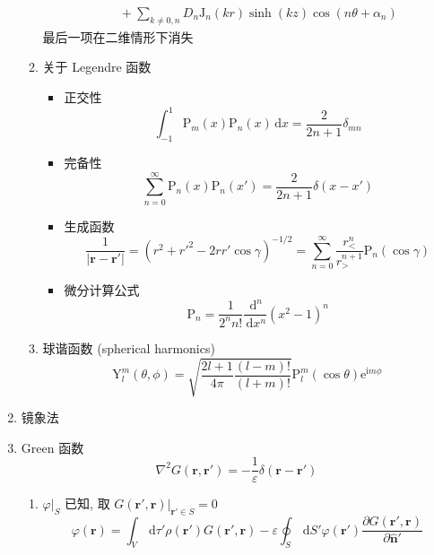 \documentclass[12pt,a4paper]{article}%
\numberwithin{equation}{section}%
\renewcommand*{\vec}[1]{\bm{#1}}%
\newcommand{\dif}{\,\mathrm d}
\newcommand\mi{\mathrm{i}}
\newcommand\e{\mathrm{e}}%
\newcommand*{\uvec}[1]{\hat{\vec{#1}}}
\begin{document}
\begin{enumerate}
\begin{enumerate}
\begin{align}
            & \quad + \sum_{k\neq 0,n}D_n\mathrm J_n(kr)\sinh(kz)\cos(n\theta + \alpha_n)
        \end{align}
        最后一项在二维情形下消失
        \item 关于 Legendre 函数
        \begin{itemize}
            \item 正交性
            \begin{equation}
                \int_{-1}^1\mathrm P_m(x)\mathrm P_n(x)\dif x = \frac2{2n+1}\delta_{mn}
            \end{equation}
            \item 完备性
            \begin{equation}
                \sum_{n=0}^\infty \mathrm P_n(x) \mathrm P_n(x') = \frac{2}{2n+1}\delta(x-x')
            \end{equation}
            \item 生成函数
            \begin{equation}
                \frac 1{|\vec r - \vec r'|} = (r^2 + r'^2 - 2rr'\cos\gamma)^{-1/2} = \sum_{n=0}^\infty\frac{r^n_<}{r^{n+1}_>}\mathrm P_n(\cos\gamma)
            \end{equation}
            \item 微分计算公式
            \begin{equation}
                \mathrm P_n = \frac1{2^n n!}\frac{\dif^n}{\dif x^n}(x^2 - 1)^n
            \end{equation}
        \end{itemize}
        \item 球谐函数 (spherical harmonics)
        \begin{equation}
            \mathrm Y_{l}^m(\theta,\phi) = \sqrt{\frac{2l+1}{4\pi}\frac{(l-m)!}{(l+m)!}}\mathrm P_l^m(\cos\theta)\e^{\mi m\phi}
        \end{equation}
    \end{enumerate}
    \item 镜象法
    \item Green 函数
    \begin{equation}
        \nabla^2 G(\vec r, \vec r') = -\frac 1\varepsilon\delta(\vec r - \vec r')
    \end{equation}
    \begin{enumerate}
        \item $\varphi|_{S}$ 已知, 取 $G(\vec r',\vec r)|_{\vec r'\in S} = 0$
        \begin{equation}
            \varphi (\vec r) = \int_V\dif \tau'\rho(\vec r')G(\vec r',\vec r) - \varepsilon\oint_S\dif S'\varphi(\vec r')\frac{\partial G(\vec r',\vec r)}{\partial \uvec n'}

\end{equation}
\end{enumerate}
\end{enumerate}
\end{document}

